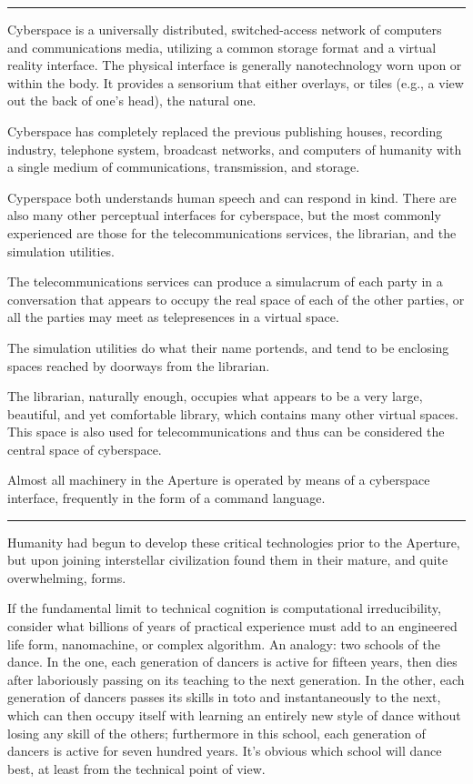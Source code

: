 \documentclass[english,11pt,letterpaper,onecolumn]{scrbook}
\begin{document}
\begin{center}\rule[3pt]{2in}{0.5pt}\end{center}

	Cyberspace is a universally distributed, switched-access network of computers and communications media, utilizing a common storage format and a virtual reality interface.  The physical interface is generally nanotechnology worn upon or within the body.  It provides a sensorium that either overlays, or tiles (e.g., a view out the back of one's head), the natural one.

 	Cyberspace has completely replaced the previous publishing houses, recording industry, telephone system, broadcast networks, and computers of humanity with a single medium of communications, transmission, and storage.

	Cyperspace both understands human speech and can respond in kind.  There are also many other perceptual interfaces for cyberspace, but the most commonly experienced are those for the telecommunications services, the librarian, and the simulation utilities.  

	The telecommunications services can produce a simulacrum of each party in a conversation that appears to occupy the real space of each of the other parties, or all the parties may meet as telepresences in a virtual space.

	The simulation utilities do what their name portends, and tend to be enclosing spaces reached by doorways from the librarian.

	The librarian, naturally enough, occupies what appears to be a very large, beautiful, and yet comfortable library, which contains many other virtual spaces.  This space is also used for telecommunications and thus can be considered the central space of cyberspace.

	Almost all machinery in the Aperture is operated by means of a cyberspace interface, frequently in the form of a command language.

\begin{center}\rule[3pt]{2in}{0.5pt}\end{center}

	Humanity had begun to develop these critical technologies prior to the Aperture, but upon joining interstellar civilization found them in their mature, and quite overwhelming, forms.  

	If the fundamental limit to technical cognition is computational irreducibility, consider what billions of years of practical experience must add to an engineered life form, nanomachine, or complex algorithm.  An analogy:  two schools of the dance.  In the one, each generation of dancers is active for fifteen years, then dies after laboriously passing on its teaching to the next generation.  In the other, each generation of dancers passes its skills in toto and instantaneously to the next, which can then occupy itself with learning an entirely new style of dance without losing any skill of the others; furthermore in this school, each generation of dancers is active for seven hundred years.  It's obvious which school will dance best, at least from the technical point of view.
\end{document}
